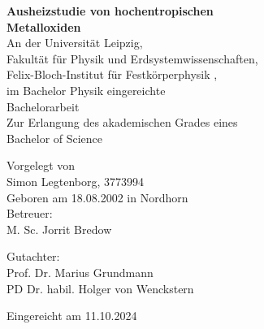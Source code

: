 \begin{titlepage}
    \begin{center}
        \vfill
        \Huge
        \textbf{Ausheizstudie von hochentropischen} \\
        \textbf{Metalloxiden} \\

        \vfill
        \Large
        An der Universität Leipzig, \\
        Fakultät für Physik und Erdsystemwissenschaften, \\
        Felix-Bloch-Institut für Festkörperphysik , \\
        im Bachelor Physik eingereichte \\

        \vfill
        \Huge
        Bachelorarbeit\\

        \vfill
        \Large
        Zur Erlangung des akademischen Grades eines \\
        Bachelor of Science

        \vfill
        Vorgelegt von \\
        Simon Legtenborg, 3773994 \\
        Geboren am 18.08.2002 in Nordhorn \\


        \vfill
        Betreuer: \\
        M. Sc. Jorrit Bredow

        \vfill
        Gutachter: \\
        Prof. Dr. Marius Grundmann \\
        PD Dr. habil. Holger von Wenckstern


        \vfill
        Eingereicht am 11.10.2024
        \vfill


    \end{center}
\end{titlepage}

